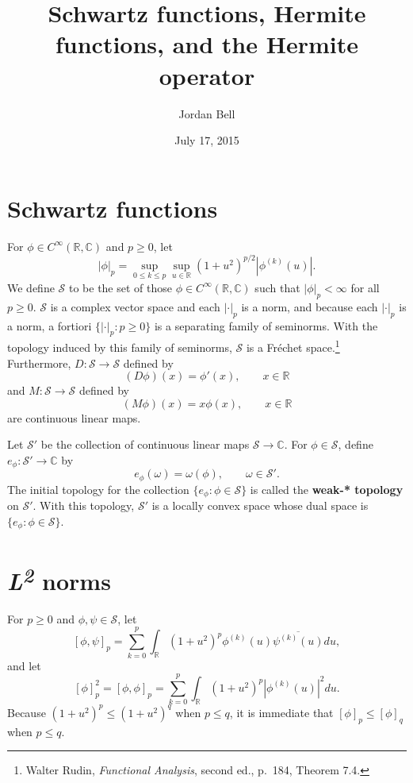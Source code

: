 \documentclass{article}
\theoremstyle{definition}
\begin{document}
\title{Schwartz functions, Hermite functions, and the Hermite operator}
\author{Jordan Bell}
\date{July 17, 2015}

\maketitle


\section{Schwartz functions}
For $\phi \in C^\infty(\mathbb{R},\mathbb{C})$ and $p \geq 0$,
let 
\[
|\phi|_p =\sup_{0 \leq k \leq p} \sup_{u \in \mathbb{R}} (1+u^2)^{p/2} |\phi^{(k)}(u)|.
\]
We define $\mathscr{S}$ to be the set of those 
$\phi \in C^\infty(\mathbb{R},\mathbb{C})$ such that $|\phi|_p<\infty$ for all $p \geq 0$. 
$\mathscr{S}$ is a complex vector space 
and each $|\cdot|_p$ is a norm, and
because each $|\cdot|_p$ is a norm, a fortiori $\{|\cdot|_p:  p \geq 0\}$ is a separating family of seminorms.
With the topology induced by this family of seminorms, $\mathscr{S}$ is a Fr\'echet space.\footnote{Walter
Rudin, {\em Functional Analysis}, second ed., p.~184, Theorem 7.4.}
Furthermore, $D:\mathscr{S} \to \mathscr{S}$ defined by
\[
(D\phi)(x) = \phi'(x),\qquad x \in \mathbb{R}
\]
and $M:\mathscr{S} \to \mathscr{S}$ defined by
\[
(M\phi)(x) = x\phi(x),\qquad x \in \mathbb{R}
\]
are continuous linear maps. 

Let $\mathscr{S}'$ be the collection of continuous linear maps $\mathscr{S}
\to \mathbb{C}$.
For $\phi \in \mathscr{S}$, define $e_\phi:\mathscr{S}' \to \mathbb{C}$ by
\[
e_\phi(\omega) = \omega(\phi), \qquad \omega \in \mathscr{S}'.
\]
The initial topology for the collection
$\{e_\phi: \phi \in \mathscr{S}\}$ is called the \textbf{weak-* topology} on $\mathscr{S}'$. 
With this topology, $\mathscr{S}'$ is a locally convex space whose dual space
is $\{e_\phi: \phi \in \mathscr{S}\}$.



\section{{\em L\textsuperscript{2}} norms}
\label{L2norms}
For $p \geq 0$ and $\phi,\psi \in \mathscr{S}$, let 
\[
[\phi,\psi]_p = \sum_{k=0}^p \int_{\mathbb{R}} (1+u^2)^{p} \phi^{(k)}(u)  \overline{\psi^{(k)}(u)} du,
\]
and let
\[
[\phi]_p^2 = [\phi,\phi]_p=  \sum_{k=0}^p \int_{\mathbb{R}} (1+u^2)^p |\phi^{(k)}(u)|^2 du.
\]
Because $(1+u^2)^p \leq (1+u^2)^q$ when $p \leq q$, it is immediate that
$[\phi]_p \leq [\phi]_q$ when $p \leq q$. 
\end{document}
